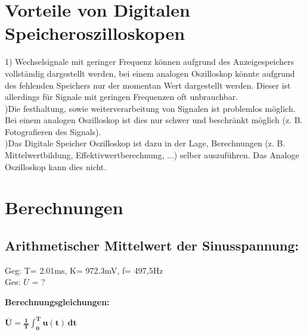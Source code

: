 \documentclass[12pt, a4paper, titlepage]{article}
\begin{document}
\newpage

\section{Vorteile von Digitalen Speicheroszilloskopen}

1) Wechselsignale mit geringer Frequenz können aufgrund des Anzeigespeichers vollständig dargestellt werden,
bei einem analogen Oszilloskop könnte aufgrund des fehlenden Speichers nur der momentan Wert dargestellt werden.
Dieser ist allerdings für Signale mit geringen Frequenzen oft unbrauchbar. \\

)Die festhaltung, sowie weiterverarbeitung von Signalen ist problemlos möglich.
Bei einem analogen Oszilloskop ist dies nur schwer und beschränkt möglich (z. B. Fotografieren des Signals). \\

)Das Digitale Speicher Oszilloskop ist dazu in der Lage,
Berechnungen (z. B. Mittelwertbildung, Effektivwertberechnung, ...) selber auszuführen.
Das Analoge Oszilloskop kann dies nicht. \\

\newpage

\section{Berechnungen} 

\vspace{1cm}

\subsection*{Arithmetischer Mittelwert der Sinusspannung:}

\vspace{0.75cm}

Geg: T= 2.01ms, K= 972.3mV, f= 497,5Hz \\

\noindent
Ges: $\overline{U}$ = ?

\vspace{1cm}

\noindent
\textbf{Berechnungsgleichungen:}

\vspace{0.75cm}

\noindent
$\bm{\displaystyle \overline{U} = \frac{1}{T} \int_{0}^{T} u(t) \, dt} $\\
\end{document}

